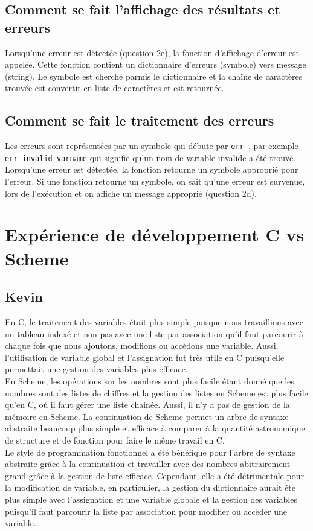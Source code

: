 \documentclass[a4paper,12pt,french]{article}
\begin{document}
	\subsection{Comment se fait l'affichage des résultats et erreurs}
        Lorsqu'une erreur est détectée (question 2e), la fonction d'affichage d'erreur est appelée. Cette fonction contient un dictionnaire d'erreurs (symbole) vers message (string). Le symbole est cherché parmis le dictionnaire et la chaîne de caractères trouvée est convertit en liste de caractères et est retournée.
	\subsection{Comment se fait le traitement des erreurs}
        Les erreurs sont représentées par un symbole qui débute par \lstinline$err-$, par exemple \lstinline$err-invalid-varname$ qui signifie qu'un nom de variable invalide a été trouvé. Lorsqu'une erreur est détectée, la fonction retourne un symbole approprié pour l'erreur. Si une fonction retourne un symbole, on sait qu'une erreur est survenue, lors de l'exécution et on affiche un message approprié (question 2d).
	\newpage
	\section{Expérience de développement C vs Scheme}
	\subsection{Kevin}
	En C, le traitement des variables était plus simple puisque nous travaillions avec un tableau indexé et non pas avec une liste par association qu'il faut parcourir à chaque fois que nous ajoutons, modifions ou accèdons une variable. Aussi, l'utilisation de variable global et l'assignation fut très utile en C puisqu'elle permettait une gestion des variables plus efficace.\\
	
	En Scheme, les opérations sur les nombres sont plus facile étant donné que les nombres sont des listes de chiffres et la gestion des listes en Scheme est plus facile qu'en C, où il faut gérer une liste chainée. Aussi, il n'y a pas de gestion de la mémoire en Scheme. La continuation de Scheme permet un arbre de syntaxe abstraite beaucoup plus simple et efficace à comparer à la quantité astronomique de structure et de fonction pour faire le même travail en C.\\
	
	Le style de programmation fonctionnel a été bénéfique pour l'arbre de syntaxe abstraite grâce à la continuation et travailler avec des nombres abitrairement grand grâce à la gestion de liste efficace. Cependant, elle a été détrimentale pour la modification de variable, en particulier, la gestion du dictionnaire aurait été plus simple avec l'assignation et une variable globale et la gestion des variables puisqu'il faut parcourir la liste par association pour modifier ou accèder une variable.\\
\end{document}
